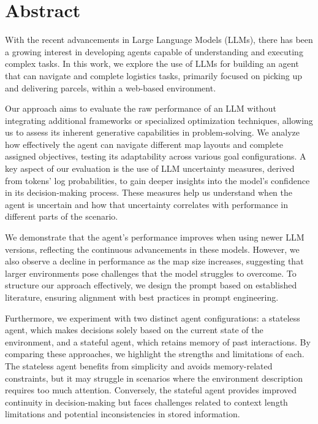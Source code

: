 \chapter*{Abstract}
\label{cha:abstract}

With the recent advancements in Large Language Models (LLMs), there has been a growing
interest in developing agents capable of understanding and executing complex tasks.
In this work, we explore the use of LLMs for building an agent that can navigate
and complete logistics tasks, primarily focused on picking up and delivering
parcels, within a web-based environment.

Our approach aims to evaluate the raw performance of an LLM without integrating additional
frameworks or specialized optimization techniques, allowing us to assess its
inherent generative capabilities in problem-solving. We analyze how effectively the
agent can navigate different map layouts and complete assigned objectives,
testing its adaptability across various goal configurations. A key aspect of our
evaluation is the use of LLM uncertainty measures, derived from tokens' log probabilities,
to gain deeper insights into the model's confidence in its decision-making
process. These measures help us understand when the agent is uncertain and how that
uncertainty correlates with performance in different parts of the scenario.

We demonstrate that the agent's performance improves when using newer LLM versions,
reflecting the continuous advancements in these models. However, we also observe
a decline in performance as the map size increases, suggesting that larger environments
pose challenges that the model struggles to overcome. To structure our approach
effectively, we design the prompt based on established literature, ensuring
alignment with best practices in prompt engineering.

Furthermore, we experiment with two distinct agent configurations: a stateless
agent, which makes decisions solely based on the current state of the environment,
and a stateful agent, which retains memory of past interactions. By comparing
these approaches, we highlight the strengths and limitations of each. The
stateless agent benefits from simplicity and avoids memory-related constraints, but
it may struggle in scenarios where the environment description requires too much
attention. Conversely, the stateful agent provides improved continuity in decision-making
but faces challenges related to context length limitations and potential inconsistencies
in stored information.